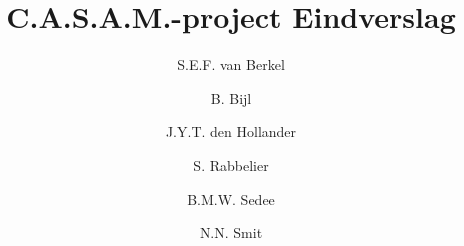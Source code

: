 \usepackage{url}

\newcommand{\casam}{C.A.S.A.M. }
\newcommand{\casamproject}{C.A.S.A.M.-pro\-ject }


\title{\casamproject Eindverslag}
\author{S.E.F. van Berkel \and B. Bijl \and J.Y.T. den Hollander \and S. Rabbelier \and B.M.W. Sedee \and N.N. Smit}



\begin{titlepage}

\maketitle

\thispagestyle{empty}

\end{titlepage}

\setcounter{page}{2}
\setcounter{tocdepth}{2}

\tableofcontents

\newpage



\tableofcontents

















\newpage






